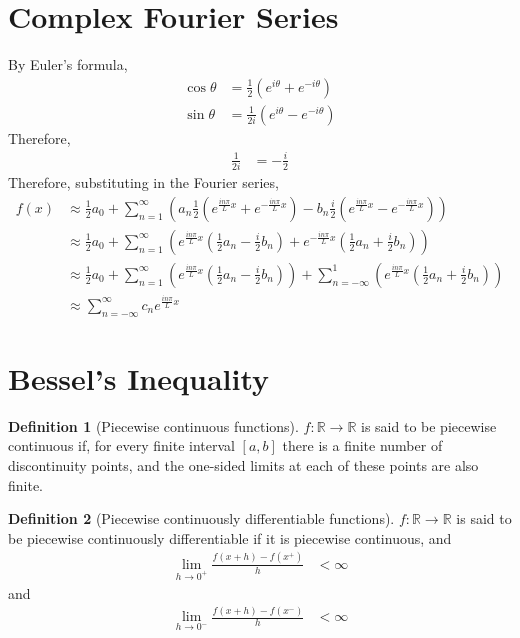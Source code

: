 \documentclass[fleqn, a4paper, 12pt, twoside]{article}
\theoremstyle{definition}
\newtheorem{definition}{Definition}
\theoremstyle{theorem}
\begin{document}
\section{Complex Fourier Series}

By Euler's formula,
\begin{align*}
	\cos \theta &= \frac{1}{2} \left( e^{i \theta} + e^{-i \theta} \right)\\
	\sin \theta &= \frac{1}{2 i} \left( e^{i \theta} - e^{-i \theta} \right)
\end{align*}
Therefore,
\begin{align*}
	\frac{1}{2 i} &= -\frac{i}{2}
\end{align*}
Therefore, substituting in the Fourier series,
\begin{align*}
	f(x) &\approx \frac{1}{2} a_0 + \sum\limits_{n = 1}^{\infty} \left( a_n \frac{1}{2} \left( e^{\frac{i n \pi}{L} x} + e^{-\frac{i n \pi}{L} x} \right) - b_n \frac{i}{2} \left( e^{\frac{i n \pi}{L} x} - e^{-\frac{i n \pi}{L} x} \right) \right)\\
	&\approx \frac{1}{2} a_0 + \sum\limits_{n = 1}^{\infty} \left( e^{\frac{i n \pi}{L} x} \left( \frac{1}{2} a_n - \frac{i}{2} b_n \right) + e^{-\frac{i n \pi}{L} x} \left( \frac{1}{2} a_n + \frac{i}{2} b_n \right) \right)\\
	&\approx \frac{1}{2} a_0 + \sum\limits_{n = 1}^{\infty} \left( e^{\frac{i n \pi}{L} x} \left( \frac{1}{2} a_n - \frac{i}{2} b_n \right) \right) + \sum\limits_{n = -\infty}^{1} \left( e^{\frac{i n \pi}{L} x} \left( \frac{1}{2} a_n + \frac{i}{2} b_n \right) \right)\\
	&\approx \sum\limits_{n = -\infty}^{\infty} c_n e^{\frac{i n \pi}{L} x}
\end{align*}

\section{Bessel's Inequality}

\begin{definition}[Piecewise continuous functions]
	$f : \mathbb{R} \to \mathbb{R}$ is said to be piecewise continuous if, for every finite interval $[a,b]$ there is a finite number of discontinuity points, and the one-sided limits at each of these points are also finite.
\end{definition}

\begin{definition}[Piecewise continuously differentiable functions]
	$f : \mathbb{R} \to \mathbb{R}$ is said to be piecewise continuously differentiable if it is piecewise continuous, and
	\begin{align*}
		\lim\limits_{h \to 0^+} \frac{f(x + h) - f(x^+)}{h} &< \infty
	\end{align*}
	and
	\begin{align*}
		\lim\limits_{h \to 0^-} \frac{f(x + h) - f(x^-)}{h} &< \infty
	\end{align*}
\end{definition}
\end{document}
